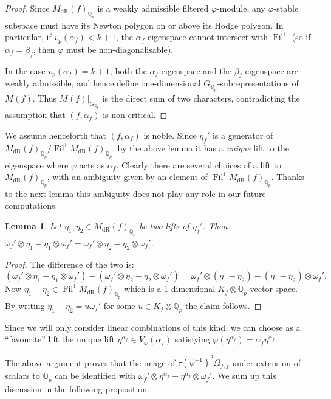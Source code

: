 \documentclass[10pt,a4paper]{amsart}
\newtheorem{lemma}{Lemma}
\DeclareMathOperator{\Fil}{Fil}
\newcommand{\Q}{\numberset{Q}}
\DeclareMathOperator{\dR}{dR}
\DeclareMathOperator{\et}{\acute{e}t}
\renewcommand{\phi}{\varphi}
\newcommand{\numberset}{\mathbb}
\begin{document}
  \begin{proof}
   Since $M_{\dR}(f)_{\Q_p}$ is a weakly admissible filtered $\varphi$-module, any $\varphi$-stable subspace must have its Newton polygon on or above its Hodge polygon. In particular, if $v_p(\alpha_f) < k+1$, the $\alpha_f$-eigenspace cannot intersect with $\Fil^1$ (so if $\alpha_f = \beta_f$, then $\varphi$ must be non-diagonalisable).
   
   In the case $v_p(\alpha_f) = k+1$, both the $\alpha_f$-eigenspace and the $\beta_f$-eigenspace are weakly admissible, and hence define one-dimensional $G_{\Q_p}$-subrepresentations of $M_{\et}(f)$. Thus $M_{\et}(f)|_{G_{\Q_p}}$ is the direct sum of two characters, contradicting the assumption that $(f, \alpha_f)$ is non-critical.
  \end{proof}

  We assume henceforth that $(f, \alpha_f)$ is noble. Since $\eta_f'$ is a generator of $M_{\dR}(f)_{\Q_p}/\Fil^1 M_{\dR}(f)_{\Q_p}$, by the above lemma it has a \emph{unique} lift to the eigenspace where $\phi$ acts as $\alpha_f$. Clearly there are several choices of a lift to $M_{\dR}(f)_{\Q_p}$, with an ambiguity given by an element of $\Fil^1 M_{\dR}(f)_{\Q_p}$. Thanks to the next lemma this ambiguity does not play any role in our future computations.

  \begin{lemma}
   Let $\eta_1, \eta_2 \in M_{\dR}(f)_{\Q_p}$ be two lifts of $\eta_f'$. Then $\omega_f' \otimes \eta_1 - \eta_1 \otimes \omega_f' = \omega_f' \otimes \eta_2 - \eta_2 \otimes \omega_f'$.
  \end{lemma}

  \begin{proof}
   The difference of the two is:
   \[
    (\omega_f' \otimes \eta_1 - \eta_1 \otimes \omega_f') - (\omega_f'\otimes \eta_2 - \eta_2 \otimes \omega_f') = \omega_f' \otimes (\eta_1 - \eta_2) - (\eta_1 - \eta_2)\otimes \omega_f'.
   \]
   Now $\eta_1 - \eta_2 \in \Fil^1 M_{\dR}(f)_{\Q_p}$ which is a $1$-dimensional $K_f\otimes\Q_p$-vector space. By writing $\eta_1 - \eta_2 = u\omega_f'$ for some $u\in K_f\otimes\Q_p$ the claim follows.
  \end{proof}

  Since we will only consider linear combinations of this kind, we can choose as a ``favourite'' lift the unique lift $\eta^{\alpha_f} \in V_{\phi}(\alpha_f)$ satisfying $\phi(\eta^{\alpha_f}) = \alpha_f\eta^{\alpha_f}$.

  The above argument proves that the image of $\tau(\psi^{-1})^2\Omega_{f,f}$ under extension of scalars to $\Q_p$ can be identified with $\omega_f'\otimes\eta^{\alpha_f} -\eta^{\alpha_f}\otimes\omega_f'$. We sum up this discussion in the following proposition.
\end{document}
